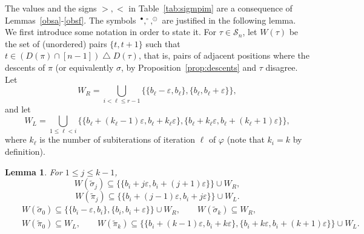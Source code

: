 \documentclass[11pt]{amsart}
\newtheorem{lemma}[theorem]{Lemma}
\renewcommand\S{\mathcal S}
\newcommand\wt{\widetilde}
\newcommand\bij{\varphi}
\newcommand\eps{\varepsilon}
\newcommand\sigm{\wt\sigma}
\newcommand\pim{\wt\pi}
\begin{document}
The values and the signs $>,<$ in Table~\ref{tab:sigmpim} are a consequence of Lemmas~\ref{obsa}-\ref{obsf}.
The symbols~$^\bullet,^\circ,^\odot$ are justified in the following lemma. We first introduce some notation in order to state it.
For $\tau\in\S_n$, let $W(\tau)$ be the set of (unordered) pairs $\{t,t+1\}$ such that $t\in (D(\pi)\cap[n-1])\bigtriangleup D(\tau)$, that is, pairs of adjacent positions
where the descents of $\pi$ (or equivalently $\sigma$, by Proposition~\ref{prop:descents} and $\tau$ disagree.
Let $$W_R=\bigcup_{i<\ell\le r-1}\{\{b_\ell-\eps,b_\ell\},\{b_\ell,b_\ell+\eps\}\},$$
and let $$W_L=\bigcup_{1\le\ell<i}\{\{b_\ell+(k_\ell{-}1)\eps,b_\ell+k_\ell\eps\},\{b_\ell+k_\ell\eps,b_\ell+(k_\ell{+}1)\eps\}\},$$
where $k_\ell$ is the number of subiterations of iteration $\ell$ of $\bij$ (note that $k_i=k$ by definition).

\begin{lemma}\label{lem:relorder}
For $1\le j\le k-1$, $$W(\sigm_j)\subseteq\{\{b_i+j\eps,b_i+(j{+}1)\eps\}\}\cup W_R,$$
$$W(\pim_j)\subseteq\{\{b_i+(j{-}1)\eps,b_i+j\eps\}\}\cup W_L.$$
\begin{eqnarray*}
&&W(\sigm_0)\subseteq\{\{b_i-\eps,b_i\},\{b_i,b_i+\eps\}\}\cup W_R, \qquad W(\sigm_k)\subseteq W_R, \\
&&W(\pim_0)\subseteq W_L, \qquad W(\pim_k)\subseteq\{\{b_i+(k{-}1)\eps,b_i+k\eps\},\{b_i+k\eps,b_i+(k{+}1)\eps\}\}\cup W_L.
\end{eqnarray*}
\end{lemma}
\end{document}
